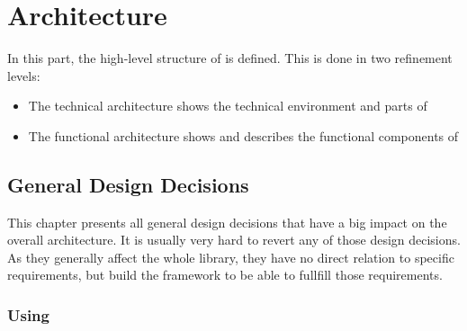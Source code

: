 \part{Architecture}
\label{sec:Architeture}

In this part, the high-level structure of \LibName{} is defined. This is done in two refinement levels:
\begin{itemize}
\item The technical architecture shows the technical environment and parts of \LibName{}
\item The functional architecture shows and describes the functional components of \LibName{}
\end{itemize}


\chapter{General Design Decisions}
\label{sec:GeneralDesignDecisions}

This chapter presents all general design decisions that have a big impact on the overall architecture. It is usually very hard to revert any of those design decisions. As they generally affect the whole library, they have no direct relation to specific requirements, but build the framework to be able to fullfill those requirements.


\section{Using \JavaVersion{}}
\label{sec:VerwendungVonJava}

